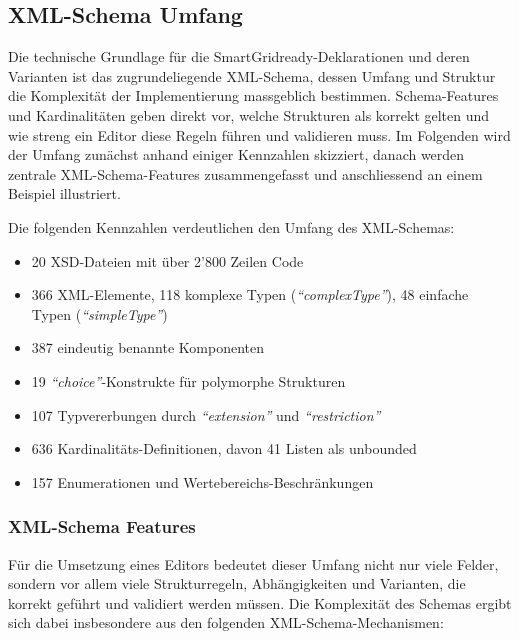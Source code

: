 \documentclass[a4paper,12pt]{article}
\newcommand{\xmlelement}[1]{\textit{``#1''}}
\begin{document}
\newpage

\subsection{XML-Schema Umfang}

Die technische Grundlage für die SmartGridready-Deklarationen und deren Varianten ist das zugrundeliegende 
XML-Schema, dessen Umfang und Struktur die Komplexität der Implementierung massgeblich bestimmen. 
Schema-Features und Kardinalitäten geben direkt vor, welche Strukturen als korrekt gelten und wie streng ein 
Editor diese Regeln führen und validieren muss. Im Folgenden wird der Umfang zunächst anhand einiger Kennzahlen 
skizziert, danach werden zentrale XML-Schema-Features zusammengefasst und anschliessend an einem Beispiel 
illustriert. \newline

\noindent Die folgenden Kennzahlen verdeutlichen den Umfang des XML-Schemas:

\begin{itemize}
    \item 20 XSD-Dateien mit über 2'800 Zeilen Code
    \item 366 XML-Elemente, 118 komplexe Typen (\xmlelement{complexType}), 48 einfache Typen (\xmlelement{simpleType})
    \item 387 eindeutig benannte Komponenten
    \item 19 \xmlelement{choice}-Konstrukte für polymorphe Strukturen
    \item 107 Typvererbungen durch \xmlelement{extension} und \xmlelement{restriction}
    \item 636 Kardinalitäts-Definitionen, davon 41 Listen als unbounded
    \item 157 Enumerationen und Wertebereichs-Beschränkungen
\end{itemize}

\subsubsection{XML-Schema Features}

Für die Umsetzung eines Editors bedeutet dieser Umfang nicht nur viele Felder, sondern vor allem viele 
Strukturregeln, Abhängigkeiten und Varianten, die korrekt geführt und validiert werden müssen. Die Komplexität 
des Schemas ergibt sich dabei insbesondere aus den folgenden XML-Schema-Mechanismen:
\newline
\end{document}
